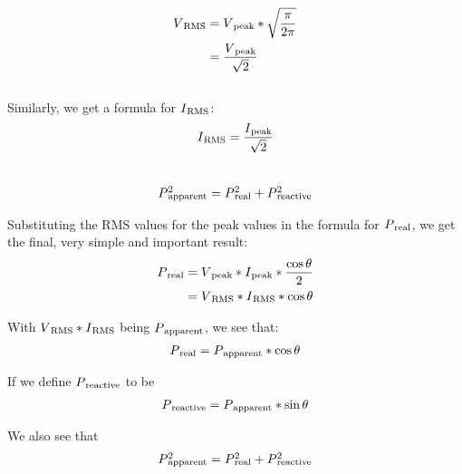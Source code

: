\documentclass[a4paper]{article}
\def\SB#1{\textsubscript{{#1}}}
\def\SPSB#1#2{\rlap{\textsuperscript{#1}}\SB{#2}}
\begin{document}
\begin{align*}
  V\SB{RMS} &= V\SB{peak} * \sqrt{\frac{\pi}{2 \pi}}\\
  &= \frac{V\SB{peak}}{\sqrt{2}}\\
\end{align*}\\

Similarly, we get a formula for $I\SB{RMS}$:\\

\begin{align*}
  I\SB{RMS} &= \frac{I\SB{peak}}{\sqrt{2}}\\
\end{align*}\\

\begin{align*}
  P\SPSB{2}{apparent} &= P\SPSB{2}{real} + P\SPSB{2}{reactive}\\
\end{align*}

Substituting the RMS values for the peak values in the formula for 
$P\SB{real}$, we get the final, very simple and important result:\\

\begin{align*}
  P\SB{real} &= V\SB{peak} * I\SB{peak} * \frac{\cos{\theta}}{2}\\
  &= V\SB{RMS} * I\SB{RMS} * \cos{\theta} \\
\end{align*}

With $V\SB{RMS} * I\SB{RMS}$ being $P\SB{apparent}$, we  see that:\\

\begin{align*}
  P\SB{real} &= P\SB{apparent} * \cos{\theta} \\
\end{align*}

If we define $P\SB{reactive}$ to be\\

\begin{align*}
  P\SB{reactive} &= P\SB{apparent} * \sin{\theta} \\
\end{align*}

We also see that\\

\begin{align*}
  P\SPSB{2}{apparent} &= P\SPSB{2}{real} + P\SPSB{2}{reactive} \\
\end{align*}
\end{document}
